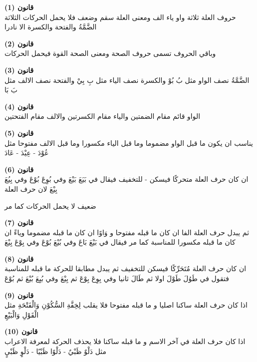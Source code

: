 \begin{twocol}
\begin{rightcol}
\textbf{(1) قانون}\\
حروف العلة ثلاثة واو ياء الف ومعنى العلة سقم وضعف فلا يحمل الحركات الثلاثة الضَّمَّةُ والفتحة والكسرة الا نادرا
\par
\textbf{(2) قانون}\\
وباقي الحروف تسمى حروف الصحة ومعنى الصحة القوة فيحمل الحركات
\par
\textbf{(3) قانون}\\
الضَّمَّةُ نصف الواو مثل بُ بُوْ والكسرة نصف الياء مثل بِ بِيْ والفتحة نصف الالف مثل بَ بَا
\par
\textbf{(4) قانون}\\
الواو قائم مقام الضمتين والياء مقام الكسرتين والالف مقام الفتحتين
\par
\textbf{(5) قانون}\\
يناسب ان يكون ما قبل الواو مضموما وما قبل الياء مكسورا وما قبل الالف مفتوحا مثل عُوْدَ - عِيْدَ - عَادَ
\par
\textbf{(6) قانون}\\
ان كان حرف العلة متحركًا فيسكن - للتخفيف فيقال في بَيَعَ بَيْعَ وفي بُوِعَ بُوْعَ وفي بِيُعَ بِيْعَ لان حرف العلة
\end{rightcol}
\begin{leftcol}
ضعيف لا يحمل الحركات كما مر
\par
\textbf{(7) قانون}\\
ثم يبدل حرف العلة الفا ان كان ما قبله مفتوحا و وَاوًا ان كان ما قبله مضموما وياءً ان كان ما قبله مكسورا للمناسبة كما مر فيقال في بَيْعَ بَاعَ وفي بُيْعَ بُوْعَ وفي بِوْعَ بِيْعَ
\par
\textbf{(8) قانون}\\
ان كان حرف العلة مُتَحَرِّكًا فيسكن للتخفيف ثم يبدل مطابقا للحركة ما قبله للمناسبة فتقول في طَوُلَ طَوْلَ اولا ثم طَالَ ثانيا وفي بِوِعَ بِوْعَ ثم بِيْعَ وفي بُيِعَ بُيْعَ ثم بُوْعَ
\par
\textbf{(9) قانون}\\
اذا كان حرف العلة ساكنا اصليا و ما قبله مفتوحا فلا يقلب لِخِفَّةِ السُّكُوْنِ وَالْفَتْحَةِ مثل الْقَوْلِ وَالْبَيْعِ
\par
\textbf{(10) قانون}\\
اذا كان حرف العلة في آخر الاسم و ما قبله ساكنا فلا يحذف الحركة لمعرفة الاعراب مثل دَلْوٌ ظَبْيٌ - دَلْوًا ظَبْيًا - دَلْوٍ ظَبْيٍ
\par
\end{leftcol}
\end{twocol}
